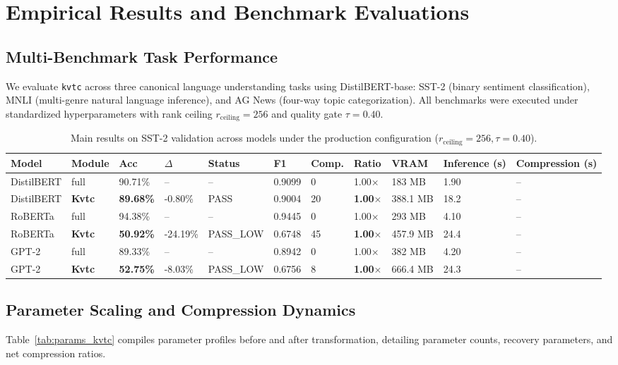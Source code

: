 \section{Empirical Results and Benchmark Evaluations}
\label{sec:results}

\subsection{Multi-Benchmark Task Performance}
We evaluate \texttt{kvtc} across three canonical language understanding tasks using DistilBERT-base: SST-2 (binary sentiment classification), MNLI (multi-genre natural language inference), and AG News (four-way topic categorization). All benchmarks were executed under standardized hyperparameters with rank ceiling $r_{\mathrm{ceiling}} = 256$ and quality gate $\tau = 0.40$.

\begin{table}[t]
\centering
\small
\begin{tabular}{lllllllllll}
\toprule
\textbf{Model} & \textbf{Module} & \textbf{Acc} & \textbf{$\Delta$} & \textbf{Status} & \textbf{F1} & \textbf{Comp.} & \textbf{Ratio} & \textbf{VRAM} & \textbf{Inference (s)} & \textbf{Compression (s)} \\
\midrule
DistilBERT & full & 90.71\% & -- & -- & 0.9099 & 0 & 1.00$\times$ & 183 MB & 1.90 & -- \\
DistilBERT & \textbf{Kvtc} & \textbf{89.68\%} & -0.80\% & PASS & 0.9004 & 20 & \textbf{1.00$\times$} & 388.1 MB & 18.2 & -- \\
RoBERTa & full & 94.38\% & -- & -- & 0.9445 & 0 & 1.00$\times$ & 293 MB & 4.10 & -- \\
RoBERTa & \textbf{Kvtc} & \textbf{50.92\%} & -24.19\% & PASS_LOW & 0.6748 & 45 & \textbf{1.00$\times$} & 457.9 MB & 24.4 & -- \\
GPT-2 & full & 89.33\% & -- & -- & 0.8942 & 0 & 1.00$\times$ & 382 MB & 4.20 & -- \\
GPT-2 & \textbf{Kvtc} & \textbf{52.75\%} & -8.03\% & PASS_LOW & 0.6756 & 8 & \textbf{1.00$\times$} & 666.4 MB & 24.3 & -- \\
\bottomrule
\end{tabular}
\caption{Main results on SST-2 validation across models under the production configuration ($r_{\mathrm{ceiling}}=256, \tau=0.40$).}
\label{tab:main_sst2}
\end{table}

\subsection{Parameter Scaling and Compression Dynamics}
Table~\ref{tab:params_kvtc} compiles parameter profiles before and after transformation, detailing parameter counts, recovery parameters, and net compression ratios.

